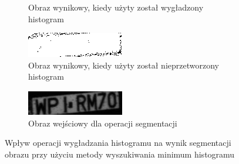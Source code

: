 \begin{figure}
\begin{subfigure}[b]{0.45\textwidth}
    \caption{Obraz wynikowy, kiedy użyty został wygładzony histogram}
    \label{fig:research_min_histogram_good_output}
  \end{subfigure}
  \begin{subfigure}[b]{0.45\textwidth}
    \includegraphics[width=\textwidth]{img/research-min-histogram-bad-output}
    \caption{Obraz wynikowy, kiedy użyty został nieprzetworzony histogram}
    \label{fig:research_min_histogram_bad_output}
  \end{subfigure}
 \begin{subfigure}[b]{0.45\textwidth}
    \includegraphics[width=\textwidth]{img/research-min-histogram-input}
    \caption{Obraz wejściowy dla operacji segmentacji}
    \label{fig:research_min_histogram_input}
  \end{subfigure}
  \caption{Wpływ operacji wygładzania histogramu na wynik segmentacji obrazu przy użyciu metody wyszukiwania minimum histogramu}
  \label{fig:research_min_histogram}
\end{figure}

